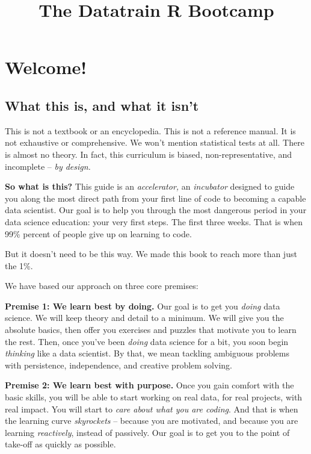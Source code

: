 \documentclass[
]{book}
\title{The Datatrain R Bootcamp}
\author{}
\date{\vspace{-2.5em}}
\begin{document}
\maketitle

{
\setcounter{tocdepth}{1}
\tableofcontents
}
\hypertarget{welcome}{%
\chapter{Welcome!}\label{welcome}}

\hypertarget{what-this-is-and-what-it-isnt}{%
\section*{What this is, and what it isn't}\label{what-this-is-and-what-it-isnt}}

This is not a textbook or an encyclopedia. This is not a reference manual. It is not exhaustive or comprehensive. We won't mention statistical tests at all. There is almost no theory. In fact, this curriculum is biased, non-representative, and incomplete -- \emph{by design.}

\textbf{So what is this?} This guide is an \emph{accelerator,} an \emph{incubator} designed to guide you along the most direct path from your first line of code to becoming a capable data scientist. Our goal is to help you through the most dangerous period in your data science education: your very first steps. The first three weeks. That is when 99\% percent of people give up on learning to code.

But it doesn't need to be this way. We made this book to reach more than just the 1\%.

We have based our approach on three core premises:

\textbf{Premise 1: We learn best by doing.} Our goal is to get you \emph{doing} data science. We will keep theory and detail to a minimum. We will give you the absolute basics, then offer you exercises and puzzles that motivate you to learn the rest. Then, once you've been \emph{doing} data science for a bit, you soon begin \emph{thinking} like a data scientist. By that, we mean tackling ambiguous problems with persistence, independence, and creative problem solving.

\textbf{Premise 2: We learn best with purpose.} Once you gain comfort with the basic skills, you will be able to start working on real data, for real projects, with real impact. You will start to \emph{care about what you are coding}. And that is when the learning curve \emph{skyrockets} -- because you are motivated, and because you are learning \emph{reactively}, instead of passively. Our goal is to get you to the point of take-off as quickly as possible.
\end{document}
